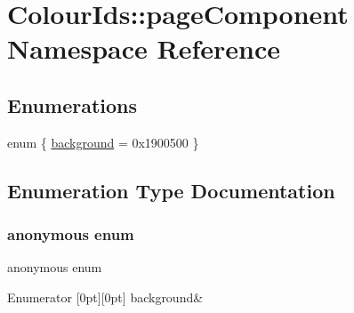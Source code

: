 \hypertarget{namespaceColourIds_1_1pageComponent}{}\section{Colour\+Ids\+:\+:page\+Component Namespace Reference}
\label{namespaceColourIds_1_1pageComponent}
\subsection*{Enumerations}
\begin{DoxyCompactItemize}
\item 
enum \{ \mbox{\hyperlink{namespaceColourIds_1_1pageComponent_a1237a7f561fc74fc644aba80322453d5adea38b52a13a0cfc1784d0d831120d34}{background}} = 0x1900500
 \}
\end{DoxyCompactItemize}


\subsection{Enumeration Type Documentation}
\mbox{\label{namespaceColourIds_1_1pageComponent_a1237a7f561fc74fc644aba80322453d5}} 
\subsubsection{\texorpdfstring{anonymous enum}{anonymous enum}}
{\footnotesize\ttfamily anonymous enum}

\begin{DoxyEnumFields}{Enumerator}
[0pt][0pt]{}\mbox{\label{namespaceColourIds_1_1pageComponent_a1237a7f561fc74fc644aba80322453d5adea38b52a13a0cfc1784d0d831120d34}} 
background&\\
\hline

\end{DoxyEnumFields}
